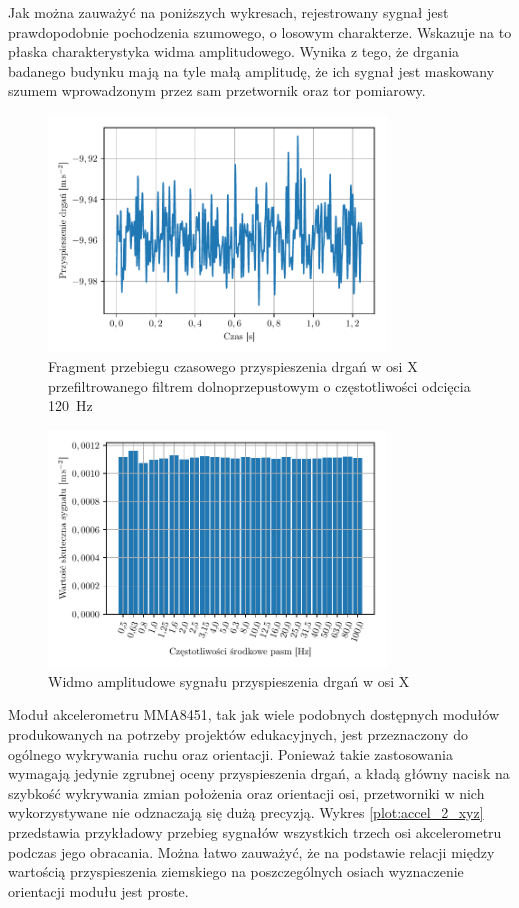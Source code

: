 \documentclass[a4paper,12pt]{mwart}
\begin{document}
Jak można zauważyć na poniższych wykresach, rejestrowany sygnał jest
prawdopodobnie pochodzenia szumowego, o losowym charakterze. Wskazuje na to
płaska charakterystyka widma amplitudowego. Wynika z tego, że drgania badanego
budynku mają na tyle małą amplitudę, że ich sygnał jest maskowany szumem
wprowadzonym przez sam przetwornik oraz tor pomiarowy.

\begin{figure}[!tbh]
  \centering
  \includegraphics[width=0.8\textwidth]{./plots/accel_x.pdf}
  \caption{Fragment przebiegu czasowego przyspieszenia drgań w osi X
    przefiltrowanego filtrem dolnoprzepustowym o częstotliwości odcięcia
  \SI{120}{\hertz}}
  \label{plot:accel_x}
\end{figure}

\begin{figure}[!tbh]
  \centering
  \includegraphics[width=0.8\textwidth]{./plots/ghost_x.pdf}
  \caption{Widmo amplitudowe sygnału przyspieszenia drgań w osi X}
  \label{plot:power_x}
\end{figure}

Moduł akcelerometru MMA8451, tak jak wiele podobnych dostępnych modułów
produkowanych na potrzeby projektów edukacyjnych, jest przeznaczony do ogólnego
wykrywania ruchu oraz orientacji. Ponieważ takie zastosowania wymagają jedynie
zgrubnej oceny przyspieszenia drgań, a kładą główny nacisk na szybkość
wykrywania zmian położenia oraz orientacji osi, przetworniki w nich
wykorzystywane nie odznaczają się dużą precyzją. Wykres \ref{plot:accel_2_xyz}
przedstawia przykładowy przebieg sygnałów wszystkich trzech osi akcelerometru
podczas jego obracania. Można łatwo zauważyć, że na podstawie relacji między
wartością przyspieszenia ziemskiego na poszczególnych osiach wyznaczenie
orientacji modułu jest proste.
\end{document}
